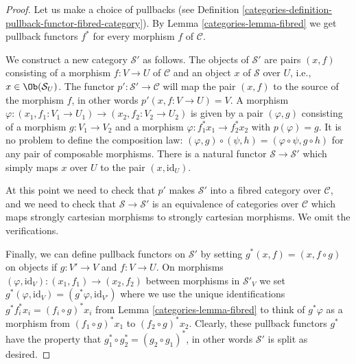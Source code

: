 \begin{proof}

Let us make a choice of pullbacks (see
Definition \ref{categories-definition-pullback-functor-fibred-category}).
By Lemma \ref{categories-lemma-fibred} we get pullback functors $f^*$ for
every morphism $f$ of $\mathcal{C}$.

\medskip\noindent
We construct a new category $\mathcal{S}'$ as follows.
The objects of $\mathcal{S}'$ are pairs $(x, f)$
consisting of a morphism $f : V \to U$ of $\mathcal{C}$
and an object $x$ of $\mathcal{S}$ over $U$, i.e.,
$x\in \Ob(\mathcal{S}_U)$. The functor
$p' : \mathcal{S}' \to \mathcal{C}$ will map the pair $(x, f)$ to the source
of the morphism $f$, in other words $p'(x, f : V\to U) = V$. A morphism
$\varphi : (x_1, f_1: V_1 \to U_1) \to (x_2, f_2 : V_2 \to U_2)$ is given by a
pair $(\varphi, g)$ consisting of a morphism $g : V_1 \to V_2$ and a morphism
$\varphi : f_1^\ast x_1 \to f_2^\ast x_2$ with $p(\varphi) = g$. It is no
problem to define the composition law: $(\varphi, g) \circ (\psi, h) =
(\varphi \circ \psi, g\circ h)$ for any pair of composable morphisms.
There is a natural functor $\mathcal{S} \to \mathcal{S}'$ which simply maps
$x$ over $U$ to the pair $(x, \text{id}_U)$.

\medskip\noindent
At this point we need to check that $p'$ makes $\mathcal{S}'$ into a
fibred category over $\mathcal{C}$, and we need to check that
$\mathcal{S} \to \mathcal{S}'$ is an equivalence of categories over
$\mathcal{C}$ which maps strongly cartesian morphisms to strongly
cartesian morphisms. We omit the verifications.

\medskip\noindent
Finally, we can define pullback functors on $\mathcal{S}'$
by setting $g^\ast(x, f) = (x, f \circ g)$ on objects if
$g : V' \to V$ and $f : V \to U$. On morphisms
$(\varphi, \text{id}_V) : (x_1, f_1) \to (x_2, f_2)$
between morphisms in $\mathcal{S}'_V$ we set $g^\ast(\varphi, \text{id}_V) =
(g^\ast\varphi, \text{id}_{V'})$ where we use the unique identifications
$g^\ast f_i^\ast x_i = (f_i \circ g)^\ast x_i$ from Lemma
\ref{categories-lemma-fibred} to think of $g^\ast\varphi$ as a morphism from
$(f_1 \circ g)^\ast x_1$ to $(f_2 \circ g)^\ast x_2$. Clearly, these pullback
functors $g^\ast$ have the property that
$g_1^\ast \circ g_2^\ast = (g_2\circ g_1)^\ast$, in other words $\mathcal{S}'$
is split as desired.
\end{proof}

